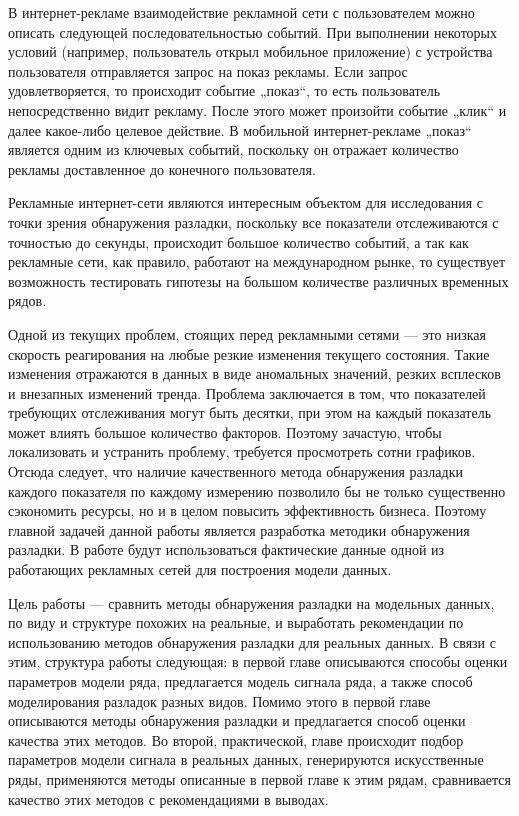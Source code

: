 \documentclass[%
12pt,
master,  %
natbib,      %
subf,        %
substylefile = spbu.rtx,
href,        %
colorlinks,  %
]{disser}
\begin{document}
В интернет-рекламе взаимодействие рекламной сети с пользователем можно описать следующей последовательностью событий. При выполнении некоторых условий (например, пользователь открыл мобильное приложение) с устройства пользователя отправляется запрос на показ рекламы. Если запрос удовлетворяется, то происходит событие „показ“, то есть пользователь непосредственно видит рекламу. После этого может произойти событие „клик“ и далее какое-либо целевое действие. В мобильной интернет-рекламе „показ“ является одним из ключевых событий, поскольку он отражает количество рекламы доставленное до конечного пользователя.

Рекламные интернет-сети являются интересным объектом для исследования с точки зрения обнаружения разладки, поскольку все показатели отслеживаются с точностью до секунды, происходит большое количество событий, а так как рекламные сети, как правило, работают на международном рынке, то существует возможность тестировать гипотезы на большом количестве различных временных рядов.

Одной из текущих проблем, стоящих перед рекламными сетями --- это низкая скорость реагирования на любые резкие изменения текущего состояния. Такие изменения отражаются в данных в виде аномальных значений, резких всплесков и внезапных изменений тренда. Проблема заключается в том, что показателей требующих отслеживания могут быть десятки, при этом на каждый показатель может влиять большое количество факторов. Поэтому зачастую, чтобы локализовать и устранить проблему, требуется просмотреть сотни графиков. Отсюда следует, что наличие качественного метода обнаружения разладки каждого показателя по каждому измерению позволило бы не только существенно сэкономить ресурсы, но и в целом повысить эффективность бизнеса. Поэтому главной задачей данной работы является разработка методики обнаружения разладки. В работе будут использоваться фактические данные одной из работающих рекламных сетей для построения модели данных.

Цель работы --- сравнить методы обнаружения разладки на модельных данных, по виду и структуре похожих на реальные, и выработать рекомендации по использованию методов обнаружения разладки для реальных данных. В связи с этим, структура работы следующая: в первой главе описываются способы оценки параметров модели ряда, предлагается модель сигнала ряда, а также способ моделирования разладок разных видов. Помимо этого в первой главе описываются методы обнаружения разладки и предлагается способ оценки качества этих методов. Во второй, практической, главе происходит подбор параметров модели сигнала в реальных данных, генерируются искусственные ряды, применяются методы описанные в первой главе к этим рядам, сравнивается качество этих методов с рекомендациями в выводах.
\end{document}
